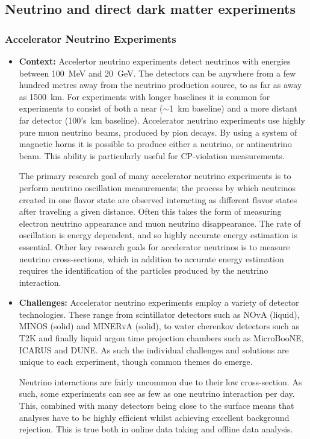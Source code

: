 \subsection{Neutrino and direct dark matter experiments}
\subsubsection{Accelerator Neutrino Experiments}\label{sec:nuaccel}
\begin{itemize}
    \item \textbf{Context:} Accelertor neutrino experiments detect neutrinos with energies between 100~MeV and 20~GeV. The detectors can be anywhere from a few hundred metres away from the neutrino production source, to as far as away as 1500~km. For experiments with longer baselines it is common for experiments to consist of both a near ($\sim$1~km baseline) and a more distant far detector (100's~km baseline). Accelerator neutrino experiments use highly pure muon neutrino beams, produced by pion decays. By using a system of magnetic horns it is possible to produce either a neutrino, or antineutrino beam. This ability is particularly useful for CP-violation measurements. 
    
    The primary research goal of many accelerator neutrino experiments is to perform neutrino oscillation measurements; the process by which neutrinos created in one flavor state are observed interacting as different flavor states after traveling a given distance. Often this takes the form of measuring electron neutrino appearance and muon neutrino disappearance. The rate of oscillation is energy dependent, and so highly accurate energy estimation is essential. Other key research goals for accelerator neutrinos is to measure neutrino cross-sections, which in addition to accurate energy estimation requires the identification of the particles produced by the neutrino interaction. 
    
    \item \textbf{Challenges:} Accelerator neutrino experiments employ a variety of detector technologies. These range from scintillator detectors such as NOvA (liquid), MINOS (solid) and MINERvA (solid), to water cherenkov detectors such as T2K and finally liquid argon time projection chambers such as MicroBooNE, ICARUS and DUNE. As such the individual challenges and solutions are unique to each experiment, though common themes do emerge.
    
    Neutrino interactions are fairly uncommon due to their low cross-section. As such, some experiments can see as few as one neutrino interaction per day. This, combined with many detectors being close to the surface means that analyses have to be highly efficient whilst achieving excellent background rejection. This is true both in online data taking and offline data analysis.
    

\end{itemize}
